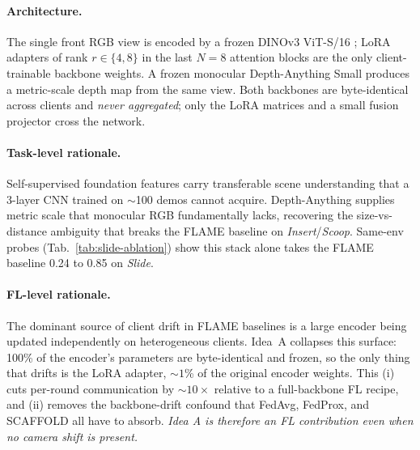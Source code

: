 \documentclass{article}
\begin{document}
\paragraph{Architecture.}
The single front RGB view is encoded by a frozen DINOv3 ViT-S/16
\cite{dinov2}; LoRA adapters \cite{lora} of rank
$r\!\in\!\{4,8\}$ in the last $N\!=\!8$ attention blocks are the
only client-trainable backbone weights. A frozen monocular
Depth-Anything Small \cite{depthanything} produces a metric-scale
depth map from the same view. Both backbones are byte-identical
across clients and \emph{never aggregated}; only the LoRA matrices
and a small fusion projector cross the network.

\paragraph{Task-level rationale.}
Self-supervised foundation features carry transferable scene
understanding that a 3-layer CNN trained on $\sim$100 demos cannot
acquire. Depth-Anything supplies metric scale that monocular RGB
fundamentally lacks, recovering the size-vs-distance ambiguity
that breaks the FLAME baseline on \emph{Insert}/\emph{Scoop}.
Same-env probes (Tab.~\ref{tab:slide-ablation}) show this stack
alone takes the FLAME baseline 0.24 to 0.85 on \emph{Slide}.

\paragraph{FL-level rationale.}
The dominant source of client drift in FLAME baselines is a large
encoder being updated independently on heterogeneous clients.
Idea~A collapses this surface: 100\% of the encoder's parameters
are byte-identical and frozen, so the only thing that drifts is
the LoRA adapter, ${\sim}1$\% of the original encoder weights.
This (i) cuts per-round communication by $\sim\!10\!\times$
relative to a full-backbone FL recipe, and (ii) removes the
backbone-drift confound that FedAvg, FedProx, and SCAFFOLD all
have to absorb. \emph{Idea A is therefore an FL contribution even
when no camera shift is present.}
\end{document}
